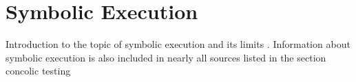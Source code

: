 \section{Symbolic Execution}
Introduction to the topic of symbolic execution and its limits \cite{SurveySymExec-CSUR18} . Information about symbolic execution is also included in nearly all sources listed in the section concolic testing